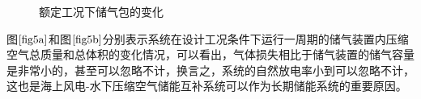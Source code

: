\documentclass{jnuthesis}
\begin{document}
	\begin{figure}[h]
		\caption{\fontsize{10.5bp}{10pt}额定工况下储气包的变化} %
		\label{fig:5}  %
	\end{figure}
	
	\par 图$ \fontsize{10.5bp}{10pt}\ref{fig5a} $和图$ \fontsize{10.5bp}{10pt}\ref{fig5b} $分别表示系统在设计工况条件下运行一周期的储气装置内压缩空气总质量和总体积的变化情况，可以看出，气体损失相比于储气装置的储气容量是非常小的，甚至可以忽略不计，换言之，系统的自然放电率小到可以忽略不计，这也是海上风电-水下压缩空气储能互补系统可以作为长期储能系统的重要原因。
	
\end{document}
